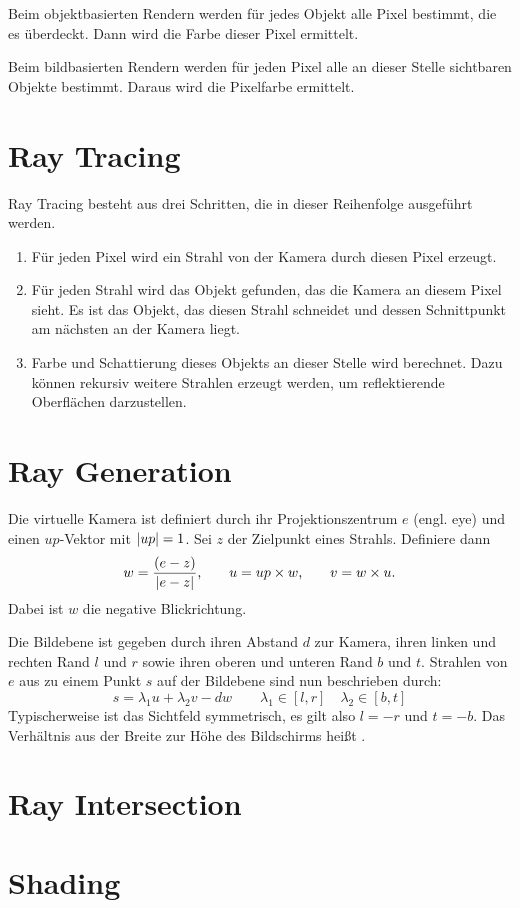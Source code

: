 Beim objektbasierten Rendern werden für jedes Objekt alle Pixel bestimmt, die es überdeckt.
Dann wird die Farbe dieser Pixel ermittelt.

Beim bildbasierten Rendern werden für jeden Pixel alle an dieser Stelle sichtbaren Objekte bestimmt.
Daraus wird die Pixelfarbe ermittelt.

\section{Ray Tracing}
Ray Tracing besteht aus drei Schritten, die in dieser Reihenfolge ausgeführt werden.
\begin{enumerate}
	\item {} Für jeden Pixel wird ein Strahl von der Kamera durch diesen Pixel erzeugt.
	\item {} Für jeden Strahl wird das Objekt gefunden, das die Kamera an diesem Pixel sieht.
	Es ist das Objekt, das diesen Strahl schneidet und dessen Schnittpunkt am nächsten an der Kamera liegt.
	\item {} Farbe und Schattierung dieses Objekts an dieser Stelle wird berechnet.
	Dazu können rekursiv weitere Strahlen erzeugt werden, um \zB reflektierende Oberflächen darzustellen.
\end{enumerate}

\section{Ray Generation}
Die virtuelle Kamera ist definiert durch ihr Projektionszentrum $e$ (engl. eye) und einen $up$-Vektor mit $\vert up \vert = 1$.
Sei $z$ der Zielpunkt eines Strahls.
Definiere dann
\[
	w = \frac{(e - z)}{\vert e - z \vert} \text{,} \qquad
	u = up \times w \text {,} \qquad
	v = w \times u \text{.}
\]
Dabei ist $w$ die negative Blickrichtung.

Die Bildebene ist gegeben durch ihren Abstand $d$ zur Kamera, ihren linken und rechten Rand $l$ und $r$ sowie ihren oberen und unteren Rand $b$ und $t$.
Strahlen von $e$ aus zu einem Punkt $s$ auf der Bildebene sind nun beschrieben durch:
\[
	s = \lambda_1 u + \lambda_2 v - dw \qquad \lambda_1 \in [l, r] \quad \lambda_2 \in [b, t] 
\]
Typischerweise ist das Sichtfeld symmetrisch, es gilt also $l = -r$ und $t = -b$.
Das Verhältnis aus der Breite zur Höhe des Bildschirms heißt .

\section{Ray Intersection}

\section{Shading}

